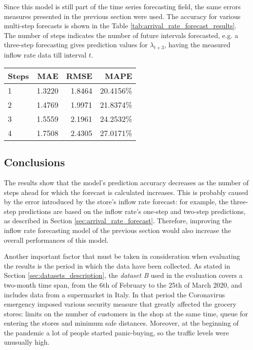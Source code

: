 Since this model is still part of the time series forecasting field, the same errors measures presented in the previous section were used. The accuracy for various multi-step forecasts is shown in the Table \ref{tab:arrival_rate_forecast_results}. The number of steps indicates the number of future intervals forecasted, e.g. a three-step forecasting gives prediction values for \( \lambda_{t+3} \), having the measured inflow rate data till interval \( t \).

\begin{center}
  \begin{tabular}{ l r r r }
    \hline
    Steps & MAE    & RMSE   & MAPE      \\
    \hline
    1     & 1.3220 & 1.8464 & 20.4156\% \\
    2     & 1.4769 & 1.9971 & 21.8374\% \\
    3     & 1.5559 & 2.1961 & 24.2532\% \\
    4     & 1.7508 & 2.4305 & 27.0171\% \\
    \hline
  \end{tabular}
\end{center}

\subsection{Conclusions}
\label{subsec:arrival_rate_forecast_results_conclusions}

The results show that the model’s prediction accuracy decreases as the number of steps ahead for which the forecast is calculated increases. This is probably caused by the error introduced by the store’s inflow rate forecast: for example, the three-step predictions are based on the inflow rate’s one-step and two-step predictions, as described in Section \ref{sec:arrival_rate_forecast}. Therefore, improving the inflow rate forecasting model of the previous section would also increase the overall performances of this model.

Another important factor that must be taken in consideration when evaluating the results is the period in which the data have been collected. As stated in Section \ref{sec:datasets_description}, the \emph{dataset B} used in the evaluation covers a two-month time span, from the 6th of February to the 25th of March 2020, and includes data from a supermarket in Italy. In that period the Coronavirus emergency imposed various security measure that greatly affected the grocery stores: limits on the number of customers in the shop at the same time, queue for entering the stores and minimum safe distances. Moreover, at the beginning of the pandemic a lot of people started panic-buying, so the traffic levels were unusually high.


